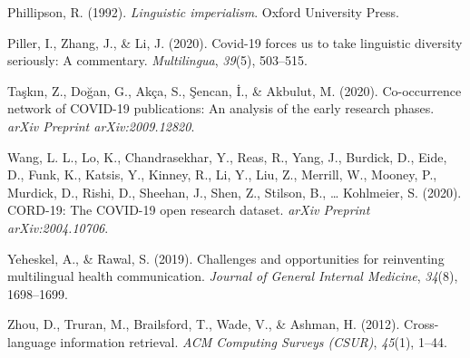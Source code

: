 \documentclass[
]{article}
\newlength{\cslhangindent}
\newenvironment{CSLReferences}[2] %
 {\begin{list}{}{%
  \setlength{\itemindent}{0pt}
  \setlength{\leftmargin}{0pt}
  \setlength{\parsep}{0pt}
  \ifodd #1
   \setlength{\leftmargin}{\cslhangindent}
   \setlength{\itemindent}{-1\cslhangindent}
  \fi
  \setlength{\itemsep}{#2\baselineskip}}}
 {\end{list}}
\begin{document}
\begin{CSLReferences}{1}{0}
Phillipson, R. (1992). \emph{Linguistic imperialism}. Oxford University
Press.

Piller, I., Zhang, J., \& Li, J. (2020). Covid-19 forces us to take
linguistic diversity seriously: A commentary. \emph{Multilingua},
\emph{39}(5), 503--515.

Taşkın, Z., Doğan, G., Akça, S., Şencan, İ., \& Akbulut, M. (2020).
Co-occurrence network of COVID-19 publications: An analysis of the early
research phases. \emph{arXiv Preprint arXiv:2009.12820}.

Wang, L. L., Lo, K., Chandrasekhar, Y., Reas, R., Yang, J., Burdick, D.,
Eide, D., Funk, K., Katsis, Y., Kinney, R., Li, Y., Liu, Z., Merrill,
W., Mooney, P., Murdick, D., Rishi, D., Sheehan, J., Shen, Z., Stilson,
B., \ldots{} Kohlmeier, S. (2020). CORD-19: The COVID-19 open research
dataset. \emph{arXiv Preprint arXiv:2004.10706}.

Yeheskel, A., \& Rawal, S. (2019). Challenges and opportunities for
reinventing multilingual health communication. \emph{Journal of General
Internal Medicine}, \emph{34}(8), 1698--1699.

Zhou, D., Truran, M., Brailsford, T., Wade, V., \& Ashman, H. (2012).
Cross-language information retrieval. \emph{ACM Computing Surveys
(CSUR)}, \emph{45}(1), 1--44.

\end{CSLReferences}
\end{document}
